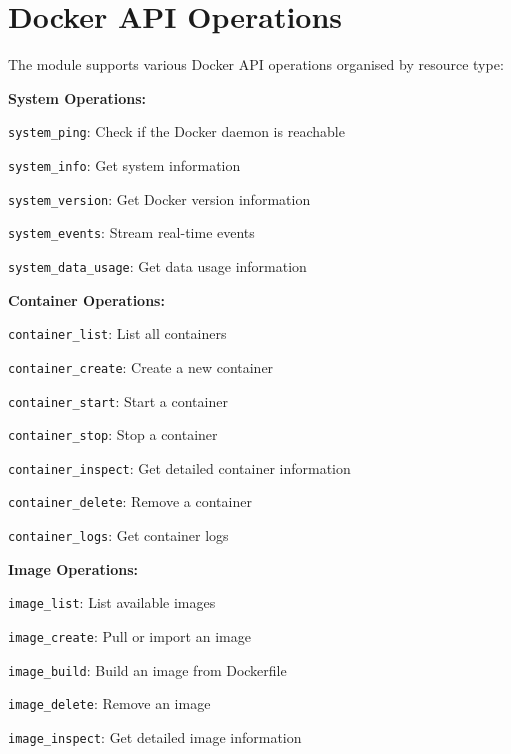 \section{Docker API Operations}

The module supports various Docker API operations organised by resource
type:

\textbf{System Operations:}

\begin{shortlist}
    \item \verb$system_ping$: Check if the Docker daemon is reachable
    \item \verb$system_info$: Get system information
    \item \verb$system_version$: Get Docker version information
    \item \verb$system_events$: Stream real-time events
    \item \verb$system_data_usage$: Get data usage information
\end{shortlist}

\textbf{Container Operations:}

\begin{shortlist}
    \item \verb$container_list$: List all containers
    \item \verb$container_create$: Create a new container
    \item \verb$container_start$: Start a container
    \item \verb$container_stop$: Stop a container
    \item \verb$container_inspect$: Get detailed container information
    \item \verb$container_delete$: Remove a container
    \item \verb$container_logs$: Get container logs
\end{shortlist}

\textbf{Image Operations:}

\begin{shortlist}
    \item \verb$image_list$: List available images
    \item \verb$image_create$: Pull or import an image
    \item \verb$image_build$: Build an image from Dockerfile
    \item \verb$image_delete$: Remove an image
    \item \verb$image_inspect$: Get detailed image information
\end{shortlist}

